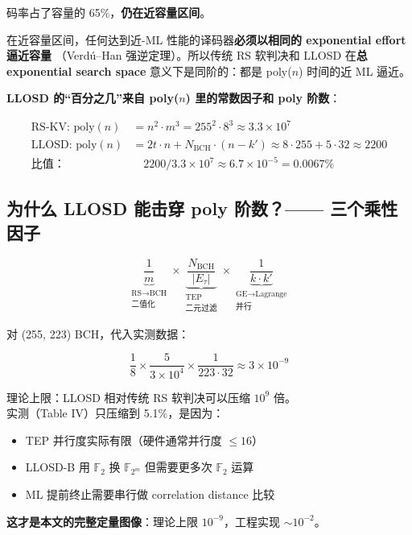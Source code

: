 \documentclass[11pt,a4paper]{article}
\begin{document}
码率占了容量的 65\%，\textbf{仍在近容量区间}。

在近容量区间，任何达到近-ML 性能的译码器\textbf{必须以相同的 exponential effort 逼近容量}
（Verd\'u–Han 强逆定理）。所以传统 RS 软判决和 LLOSD 在\textbf{总 exponential search space}
意义下是同阶的：都是 poly($n$) 时间的近 ML 逼近。

\textbf{LLOSD 的``百分之几''来自 poly($n$) 里的常数因子和 poly 阶数}：

\begin{align*}
\text{RS-KV: poly}(n) &= n^2\cdot m^3 = 255^2\cdot 8^3 \approx 3.3\times 10^7 \\
\text{LLOSD: poly}(n) &= 2t\cdot n + N_{\text{BCH}}\cdot (n-k') \approx 8\cdot 255 + 5\cdot 32 \approx 2200 \\
\text{比值：} &\quad 2200 / 3.3\times 10^7 \approx \boxed{6.7\times 10^{-5} = 0.0067\%}
\end{align*}

\subsection{为什么 LLOSD 能击穿 poly 阶数？—— 三个乘性因子}

\begin{equation}
\underbrace{\frac{1}{m}}_{\substack{\text{RS}\to\text{BCH} \\ \text{二值化}}}
\times
\underbrace{\frac{N_{\text{BCH}}}{|E_\tau|}}_{\substack{\text{TEP} \\ \text{二元过滤}}}
\times
\underbrace{\frac{1}{k\cdot k'}}_{\substack{\text{GE}\to\text{Lagrange} \\ \text{并行}}}
\end{equation}

对 (255, 223) BCH，代入实测数据：

\begin{equation}
\frac{1}{8} \times \frac{5}{3\times 10^4} \times \frac{1}{223\cdot 32}
\approx \boxed{3\times 10^{-9}}
\end{equation}

\begin{concludebox}[title=\textbf{结论 C（信息论上限 vs 工程现实）}]
理论上限：LLOSD 相对传统 RS 软判决可以压缩 $10^9$ 倍。\\
实测（Table IV）只压缩到 5.1\%，是因为：
\begin{itemize}[leftmargin=1em, itemsep=1pt, topsep=2pt]
\item TEP 并行度实际有限（硬件通常并行度 $\leq 16$）
\item LLOSD-B 用 $\mathbb{F}_2$ 换 $\mathbb{F}_{2^m}$ 但需要更多次 $\mathbb{F}_2$ 运算
\item ML 提前终止需要串行做 correlation distance 比较
\end{itemize}
\textbf{这才是本文的完整定量图像}：理论上限 $10^{-9}$，工程实现 $\sim 10^{-2}$。
\end{concludebox}
\end{document}
